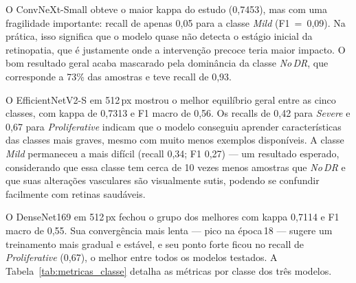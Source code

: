 \documentclass[conference]{IEEEtran}
\begin{document}
O ConvNeXt-Small obteve o maior kappa do estudo (0,7453), mas com uma
fragilidade importante: recall de apenas 0,05 para a classe
\textit{Mild} (F1~=~0,09). Na pr\'atica, isso significa que o modelo
quase n\~ao detecta o est\'agio inicial da retinopatia, que \'e
justamente onde a interven\c{c}\~ao precoce teria maior impacto. O bom
resultado geral acaba mascarado pela domin\^ancia da classe
\textit{No\,DR}, que corresponde a 73\% das amostras e teve recall de
0,93.

O EfficientNetV2-S em 512\,px mostrou o melhor equil\'ibrio geral entre
as cinco classes, com kappa de 0,7313 e F1 macro de 0,56. Os recalls de
0,42 para \textit{Severe} e 0,67 para \textit{Proliferative} indicam
que o modelo conseguiu aprender caracter\'isticas das classes mais
graves, mesmo com muito menos exemplos dispon\'iveis. A classe
\textit{Mild} permaneceu a mais dif\'icil (recall 0,34; F1 0,27) ---
um resultado esperado, considerando que essa classe tem cerca de 10
vezes menos amostras que \textit{No\,DR} e que suas altera\c{c}\~oes
vasculares s\~ao visualmente sutis, podendo se confundir facilmente com
retinas saud\'aveis.

O DenseNet169 em 512\,px fechou o grupo dos melhores com kappa 0,7114 e
F1 macro de 0,55. Sua converg\^encia mais lenta --- pico na
\'epoca\,18 --- sugere um treinamento mais gradual e est\'avel, e seu
ponto forte ficou no recall de \textit{Proliferative} (0,67), o melhor
entre todos os modelos testados. A Tabela~\ref{tab:metricas_classe}
detalha as m\'etricas por classe dos tr\^es modelos.
\end{document}
